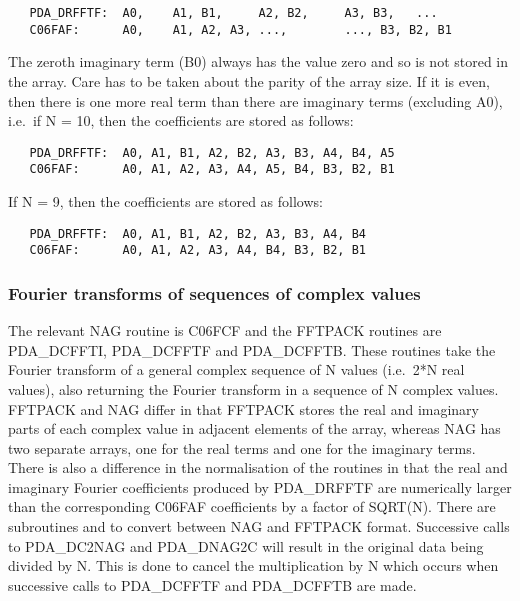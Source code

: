 \begin{verbatim}
   PDA_DRFFTF:  A0,    A1, B1,     A2, B2,     A3, B3,   ...
   C06FAF:      A0,    A1, A2, A3, ...,        ..., B3, B2, B1
\end{verbatim}

   The zeroth imaginary term (B0) always has the value zero and so is
   not stored in the array. Care has to be taken about the parity of the
   array size. If it is even, then there is one more real term than
   there are imaginary terms (excluding A0), i.e.\ if N = 10, then the
   coefficients are stored as follows:

\begin{verbatim}
   PDA_DRFFTF:  A0, A1, B1, A2, B2, A3, B3, A4, B4, A5
   C06FAF:      A0, A1, A2, A3, A4, A5, B4, B3, B2, B1
\end{verbatim}

   If N = 9, then the coefficients are stored as follows:

\begin{verbatim}
   PDA_DRFFTF:  A0, A1, B1, A2, B2, A3, B3, A4, B4
   C06FAF:      A0, A1, A2, A3, A4, B4, B3, B2, B1
\end{verbatim}


\subsubsection{Fourier transforms of sequences of complex values}

   The relevant NAG routine is C06FCF and the FFTPACK routines are
   PDA\_DCFFTI, PDA\_\-DCFFTF and PDA\_DCFFTB. These routines take the Fourier transform
   of a general complex sequence of N values (i.e.\ 2*N real values),
   also returning the Fourier transform in a sequence of N complex
   values. FFTPACK and NAG differ in that FFTPACK stores the real and
   imaginary parts of each complex value in adjacent elements of the
   array, whereas NAG has two separate arrays, one for the real terms
   and one for the imaginary terms. There is also a difference in the
   normalisation of the routines in that the real and imaginary Fourier
   coefficients produced by PDA\_DRFFTF are numerically larger than the
   corresponding C06FAF coefficients by a factor of SQRT(N). There are
   subroutines
 and 
   to convert between NAG and FFTPACK format. Successive calls to
   PDA\_DC2NAG and PDA\_DNAG2C will result in the original data being divided by
   N. This is done to cancel the multiplication by N which occurs when
   successive calls to PDA\_DCFFTF and PDA\_DCFFTB are made.

